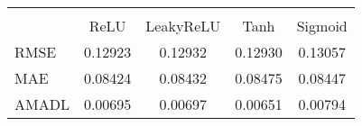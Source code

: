 \begin{tabular}{lcccc}
\hline\hline \\ [-1.8ex]
 & ReLU & LeakyReLU & Tanh & Sigmoid \\ 
 \hline 
RMSE & 0.12923 & 0.12932 & 0.12930 & 0.13057 \\ 
MAE & 0.08424 & 0.08432 & 0.08475 & 0.08447 \\ 
AMADL & 0.00695 & 0.00697 & 0.00651 & 0.00794 \\ 
\hline\hline
\end{tabular}